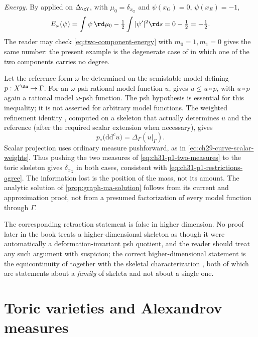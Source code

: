 \begin{example}
\emph{Energy.}  By  applied on
\(\Delta_{\cY}\), with \(\mu_0=\delta_{x_{\mathrm G}}\) and
\(\psi(x_{\mathrm G})=0\), \(\psi(x_E)=-1\),
\[
 E_\omega(\psi)=\int\psi\,\rd\mu_0-\tfrac12\int|\psi'|^2\rd s
 =0-\tfrac12=-\tfrac12 .
\]
The reader may check \eqref{eq:two-component-energy} with
\(m_0=1,m_1=0\) gives the same number: the present example is the
degenerate case of  in which one of the two
components carries no degree.
\end{example}

\begin{remark}
\label{rem:ch31-retraction}
Let the reference form \(\omega\) be determined on the semistable
model defining \(p:X^{\An}\to\Gamma\).
For an \(\omega\)-psh rational model function \(u\),
\cite[Proposition~3.8]{GJKM19} gives
\(u\leq u\circ p\), with \(u\circ p\) again a rational model
\(\omega\)-psh function.  The psh hypothesis is essential for this
inequality; it is not asserted for arbitrary model functions.
The weighted refinement identity
\cite[Proposition~2.2.26(iv)]{Thu05}, computed on a skeleton that
actually determines \(u\) and the reference (after the required
scalar extension when necessary), gives
\[
 p_*\bigl(\mathrm d\mathrm d^c u\bigr)
              =\Delta_\Gamma(u|_\Gamma).
\]
Scalar projection uses ordinary measure pushforward, as in
\eqref{eq:ch29-curve-scalar-weights}.
Thus pushing the two measures of
\eqref{eq:ch31-p1-two-measures} to the toric skeleton gives
\(\delta_{x_{\mathrm G}}\) in both cases, consistent with
\eqref{eq:ch31-p1-restrictions-agree}.
The information lost is the position of the mass, not its amount.
The analytic solution of \cref{prop:graph-ma-solution} follows
from its current and approximation proof, not from a presumed
factorization of every model function through \(\Gamma\).

The corresponding retraction statement is false in higher dimension.  No
proof later in the book treats a higher-dimensional skeleton as though it
were automatically a deformation-invariant psh quotient, and the reader
should treat any such argument with suspicion; the correct higher-dimensional
statement is the equicontinuity of 
together with the skeletal characterization
, both of which are statements about
a \emph{family} of skeleta and not about a single one.
\end{remark}

\section{Toric varieties and Alexandrov measures}
\label{sec:ch31-toric}

